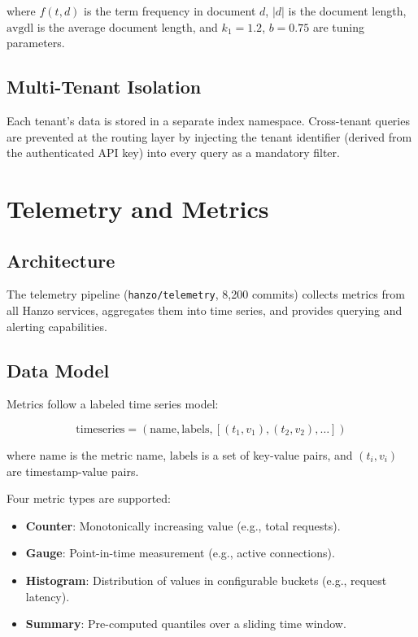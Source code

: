 \documentclass[11pt,a4paper]{article}
\begin{document}
where $f(t, d)$ is the term frequency in document $d$, $|d|$ is the document length, $\text{avgdl}$ is the average document length, and $k_1 = 1.2$, $b = 0.75$ are tuning parameters.

\subsection{Multi-Tenant Isolation}

Each tenant's data is stored in a separate index namespace. Cross-tenant queries are prevented at the routing layer by injecting the tenant identifier (derived from the authenticated API key) into every query as a mandatory filter.

\section{Telemetry and Metrics}

\subsection{Architecture}

The telemetry pipeline (\texttt{hanzo/telemetry}, 8{,}200 commits) collects metrics from all Hanzo services, aggregates them into time series, and provides querying and alerting capabilities.

\subsection{Data Model}

Metrics follow a labeled time series model:

\begin{equation}
    \text{timeseries} = (\text{name}, \text{labels}, [(t_1, v_1), (t_2, v_2), \ldots])
\end{equation}

where $\text{name}$ is the metric name, $\text{labels}$ is a set of key-value pairs, and $(t_i, v_i)$ are timestamp-value pairs.

Four metric types are supported:
\begin{itemize}
    \item \textbf{Counter}: Monotonically increasing value (e.g., total requests).
    \item \textbf{Gauge}: Point-in-time measurement (e.g., active connections).
    \item \textbf{Histogram}: Distribution of values in configurable buckets (e.g., request latency).
    \item \textbf{Summary}: Pre-computed quantiles over a sliding time window.
\end{itemize}
\end{document}
